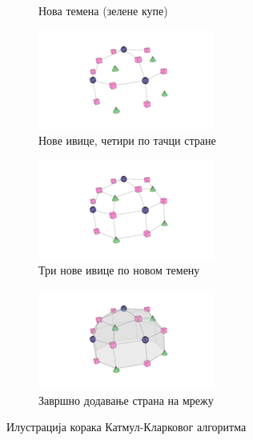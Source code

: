 \documentclass[12pt]{article}
\begin{document}
\begin{figure}[H]
\begin{subfigure}{0.3\linewidth}
			\caption{Нова темена (зелене купе)}
		\end{subfigure}
		\begin{subfigure}{0.3\linewidth}
			\includegraphics[width=\linewidth]{slike/Catmull-Clark_Recursive_Step_4.png}
			\caption{Нове ивице, четири по тачци стране}
		\end{subfigure}
		\begin{subfigure}{0.3\linewidth}
			\includegraphics[width=\linewidth]{slike/Catmull-Clark_Recursive_Step_5.png}
			\caption{Три нове ивице по новом темену}
		\end{subfigure}
		\begin{subfigure}{0.3\linewidth}
			\includegraphics[width=\linewidth]{slike/Catmull-Clark_Recursive_Step_6.png}
			\caption{Завршно додавање страна на мрежу}
		\end{subfigure}
		\caption{Илустрација корака Катмул-Кларковог алгоритма}
		\label{fig:katmulklark}
	\end{figure}
\end{document}
